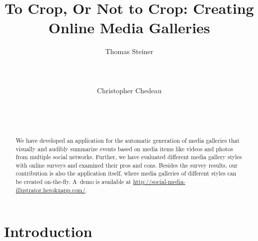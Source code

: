 \documentclass{sig-alternate}
\newcommand{\inlinelistingsize}{\fontsize{8pt}{11pt}}
\let\oldurl\url
\renewcommand{\url}[1]{\inlinelistingsize\oldurl{#1}}
\begin{document}


\title{To Crop, Or Not to Crop: Creating Online Media Galleries}

\author{
\alignauthor
Thomas Steiner\\
	\\
	\\
	\\
\alignauthor
Christopher Chedeau\\
	\\
	\\
	\\
}
\maketitle

\begin{abstract}
We have developed an application for the automatic generation of
media galleries that visually and audibly summarize events
based on media items like videos and photos from multiple social networks.
Further, we have evaluated different media gallery styles with online surveys 
and examined their pros and cons.
Besides the survey results, our contribution is also the application itself,
where media galleries of different styles can be created on-the-fly.
A~demo is available at
\url{http://social-media-illustrator.herokuapp.com/}.
\end{abstract}

\vspace{-1mm}

\vspace{-2mm}

\vspace{-2mm}

\section{Introduction}
\label{sec:introduction}
\end{document}
